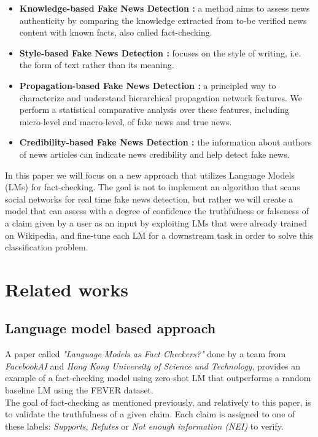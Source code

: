 \documentclass[conference]{IEEEtran}
\begin{document}
\begin{itemize}
\item \textbf{Knowledge-based Fake News Detection \cite{chernyavskiy2021whatthewikifact}:} a method aims to assess news authenticity by comparing the knowledge extracted from to-be verified news content with known facts, also called fact-checking.
\item \textbf{Style-based Fake News Detection \cite{przybyla2020capturing}:} focuses on the style of writing, i.e. the form of text rather than its meaning.
\item \textbf{Propagation-based Fake News Detection \cite{shu2020hierarchical}:} a principled way to characterize and understand hierarchical propagation network features. We perform a statistical comparative analysis over these features, including micro-level and macro-level, of fake news and true news.
\item \textbf{Credibility-based Fake News Detection \cite{sitaula2020credibility}:} the information about authors of news articles can indicate news credibility and help detect fake news.
\end{itemize}

In this paper we will focus on a new approach that utilizes Language Models (LMs) for fact-checking. The goal is not to implement an algorithm that scans social networks for real time fake news detection, but rather we will create a model that can assess with a degree of confidence the truthfulness or falseness of a claim given by a user as an input by exploiting LMs that were already trained on Wikipedia, and fine-tune each LM for a downstream task in order to solve this classification problem.

\section{Related works}
\subsection{Language model based approach \cite{lee2020language} \cite{petroni2019language}}
A paper called \textit{"Language Models as Fact Checkers?"} done by a team from \textit{FacebookAI} and \textit{Hong Kong University of Science and Technology}, provides an example of a fact-checking model using zero-shot LM that outperforms a random baseline LM using the FEVER dataset\cite{thorne2018fever}.\\

The goal of fact-checking as mentioned previously, and relatively to this paper, is to validate the truthfulness of a given claim. Each claim is assigned to one of these labels: \textit{Supports}, \textit{Refutes} or \textit{Not enough information (NEI)} to verify.\\
\end{document}

